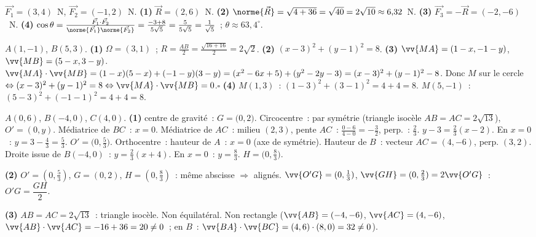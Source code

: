 
$\vec{F_1}=(3,4)$~N, $\vec{F_2}=(-1,2)$~N.
\textbf{(1)} $\vec{R}=(2,6)$~N.
\textbf{(2)} $\norme{\vec{R}}=\sqrt{4+36}=\sqrt{40}=2\sqrt{10}\approx6{,}32$~N.
\textbf{(3)} $\vec{F_3}=-\vec{R}=(-2,-6)$~N.
\textbf{(4)} $\cos\theta=\frac{\vec{F_1}\cdot\vec{F_2}}{\norme{\vec{F_1}}\norme{\vec{F_2}}}
=\frac{-3+8}{5\sqrt{5}}=\frac{5}{5\sqrt{5}}=\frac{1}{\sqrt{5}}$~;
$\theta\approx63{,}4^{\circ}$.


$A(1,-1)$, $B(5,3)$.
\textbf{(1)} $\Omega=(3,1)$~; $R=\frac{AB}{2}=\frac{\sqrt{16+16}}{2}=2\sqrt{2}$.
\textbf{(2)} $(x-3)^2+(y-1)^2=8$.
\textbf{(3)} $\vv{MA}=(1-x,-1-y)$, $\vv{MB}=(5-x,3-y)$.
$\vv{MA}\cdot\vv{MB}=(1-x)(5-x)+(-1-y)(3-y)
=(x^2-6x+5)+(y^2-2y-3)=(x-3)^2+(y-1)^2-8$.
Donc $M$ sur le cercle $\Leftrightarrow(x-3)^2+(y-1)^2=8\Leftrightarrow\vv{MA}\cdot\vv{MB}=0$.\hfill$\square$
\textbf{(4)} $M(1,3)$~: $(1-3)^2+(3-1)^2=4+4=8$.\checkmark\quad
$M(5,-1)$~: $(5-3)^2+(-1-1)^2=4+4=8$.\checkmark


$A(0,6)$, $B(-4,0)$, $C(4,0)$.
\textbf{(1)} centre de gravité~: $G=\bigl(0,2\bigr)$.
Circocentre~: par sym\'etrie (triangle isoc\`ele $AB=AC=2\sqrt{13}$), $O'=(0,y)$.
M\'ediatrice de $BC$~: $x=0$. M\'ediatrice de $AC$~: milieu $(2,3)$, pente $AC$~: $\frac{0-6}{4-0}=-\frac{3}{2}$, perp.~: $\frac{2}{3}$.
$y-3=\frac{2}{3}(x-2)$. En $x=0$~: $y=3-\frac{4}{3}=\frac{5}{3}$.
$O'=\bigl(0,\frac{5}{3}\bigr)$.
Orthocentre~: hauteur de $A$~: $x=0$ (axe de sym\'etrie). Hauteur de $B$~: vecteur $AC=(4,-6)$, perp. $(3,2)$. Droite issue de $B(-4,0)$~: $y=\frac{2}{3}(x+4)$. En $x=0$~: $y=\frac{8}{3}$.
$H=\bigl(0,\frac{8}{3}\bigr)$.

\textbf{(2)} $O'=(0,\frac{5}{3})$, $G=(0,2)$, $H=(0,\frac{8}{3})$~: m\^eme abscisse $\Rightarrow$ align\'es.\checkmark
$\vv{O'G}=(0,\frac{1}{3})$, $\vv{GH}=(0,\frac{2}{3})=2\vv{O'G}$~:
$O'G=\dfrac{GH}{2}$.\checkmark

\textbf{(3)} $AB=AC=2\sqrt{13}$~: triangle isoc\`ele. Non \'equilat\'eral. Non rectangle
($\vv{AB}=(-4,-6)$, $\vv{AC}=(4,-6)$, $\vv{AB}\cdot\vv{AC}=-16+36=20\ne0$~; en $B$~: $\vv{BA}\cdot\vv{BC}=(4,6)\cdot(8,0)=32\ne0$).

